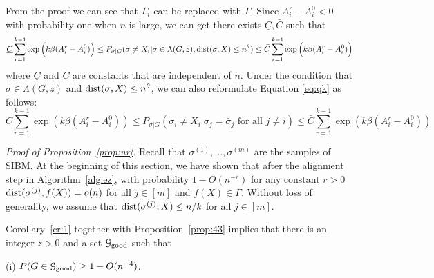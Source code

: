 \documentclass{article}
\begin{document}
\begin{remark}
	From the proof we can see that $\Gamma_i$ can be replaced with $\Gamma$. Since $A_i^r - A_i^0 < 0$ with probability one when
	$n$ is large, we can get there exists $\underline{C}, \bar{C}$ such that
	\begin{equation} \label{eq:qke}
	\underline{C}\sum_{r=1}^{k-1}\exp\Big(k\beta(A^r_i-A^0_i) \Big)  \le 
	P_{\sigma|G}(\sigma \neq X_i | \sigma \in \Lambda(G, z),
	\operatorname{dist}(\sigma, X) \leq n^{\theta})
	\le \bar{C} \sum_{r=1}^{k-1}\exp\Big(k\beta (A^r_i-A^0_i ) \Big) 
	\end{equation}
	where $\underline{C}$ and $\overline{C}$ are constants that are independent of $n$.
	Under the condition that $\bar{\sigma} \in \Lambda(G, z)$ and
	$\operatorname{dist}(\bar{\sigma}, X) \leq n^{\theta}$,
	we can also reformulate Equation \eqref{eq:qk} as follows:
	\begin{equation}\label{eq:soon}
	\underline{C} \sum_{r=1}^{k-1} \exp(k\beta(A^r_i - A^0_i)) \leq P_{\sigma | G}(\sigma_i \neq X_i | \sigma_j = \bar{\sigma}_j \text{ for all } j\neq i ) \leq
	\bar{C} \sum_{r=1}^{k-1} \exp(k\beta(A^r_i - A^0_i))
	\end{equation}
\end{remark}

\noindent
{\em Proof of Proposition~\ref{prop:nr}.}
Recall that $\sigma^{(1)},\dots,\sigma^{(m)}$ are the samples of SIBM.
At the beginning of this section, we have shown that after the alignment step in Algorithm~\ref{alg:ez}, with probability $1-O(n^{-r})$ for any constant $r>0$ $\operatorname{dist}(\sigma^{(j)}, f(X))=o(n)$ for all $j\in[m]$ and $f(X) \in \Gamma$. Without loss of generality, we assume that 
$\operatorname{dist}(\sigma^{(j)}, X) \le n/k$ for all $j\in[m]$. 

Corollary~\ref{cr:1} together with Proposition~\ref{prop:43} implies that there is an integer $z>0$ and a set $\mathcal{G}_{\operatorname{good}}$ such that

\noindent (i)
$P(G\in\mathcal{G}_{\operatorname{good}}) \ge 1- O(n^{-4})$.
\end{document}

